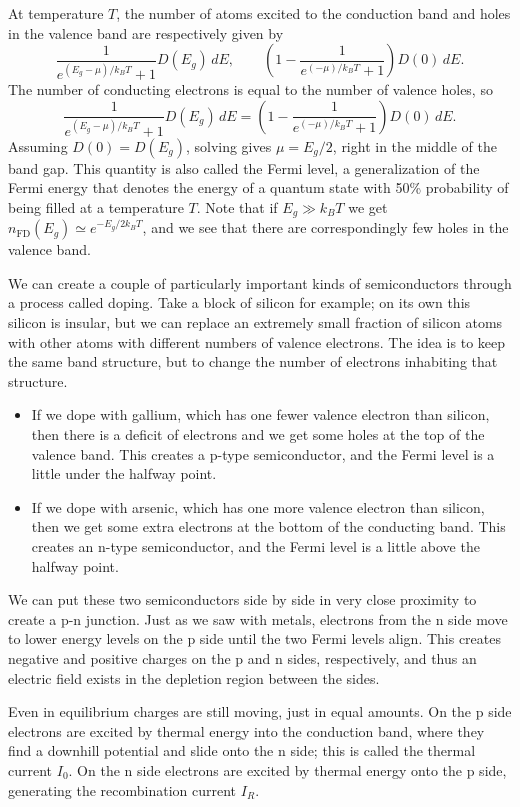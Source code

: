 \documentclass[../p052main.tex]{subfiles}
\begin{document}
At temperature $T$, the number of atoms excited to the conduction band and holes in the valence band are respectively given by
\[ \frac{1}{e^{(E_g - \mu) / k_BT} + 1} D(E_g) \,dE, \qquad \left( 1 - \frac{1}{e^{(-\mu) / k_BT} + 1} \right) D(0) \,dE. \]
The number of conducting electrons is equal to the number of valence holes, so
\[ \frac{1}{e^{(E_g - \mu) / k_BT} + 1} D(E_g) \,dE = \left( 1 - \frac{1}{e^{(-\mu) / k_BT} + 1} \right) D(0) \,dE. \]
Assuming $D(0) = D(E_g)$, solving gives $\mu = E_g / 2$, right in the middle of the band gap.
This quantity is also called the Fermi level, a generalization of the Fermi energy that denotes the energy of a quantum state with 50\% probability of being filled at a temperature $T$.
Note that if $E_g \gg k_BT$ we get $n_\textrm{FD}(E_g) \simeq e^{-E_g / 2k_BT}$, and we see that there are correspondingly few holes in the valence band.

We can create a couple of particularly important kinds of semiconductors through a process called doping.
Take a block of silicon for example; on its own this silicon is insular, but we can replace an extremely small fraction of silicon atoms with other atoms with different numbers of valence electrons.
The idea is to keep the same band structure, but to change the number of electrons inhabiting that structure.
\begin{itemize}
    \item If we dope with gallium, which has one fewer valence electron than silicon, then there is a deficit of electrons and we get some holes at the top of the valence band.
    This creates a p-type semiconductor, and the Fermi level is a little under the halfway point.

    \item If we dope with arsenic, which has one more valence electron than silicon, then we get some extra electrons at the bottom of the conducting band.
    This creates an n-type semiconductor, and the Fermi level is a little above the halfway point.
\end{itemize}
We can put these two semiconductors side by side in very close proximity to create a p-n junction.
Just as we saw with metals, electrons from the n side move to lower energy levels on the p side until the two Fermi levels align.
This creates negative and positive charges on the p and n sides, respectively, and thus an electric field exists in the depletion region between the sides.

Even in equilibrium charges are still moving, just in equal amounts.
On the p side electrons are excited by thermal energy into the conduction band, where they find a downhill potential and slide onto the n side; this is called the thermal current $I_0$.
On the n side electrons are excited by thermal energy onto the p side, generating the recombination current $I_R$.
\end{document}
